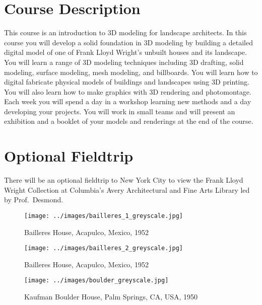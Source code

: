 \documentclass[11pt,article,oneside]{memoir}
\begin{document}
\section{Course Description}
%
This course is an introduction to 3D modeling for landscape architects. 
In this course you will develop a solid foundation in 3D modeling
by building a detailed digital model of one of 
Frank Lloyd Wright's unbuilt houses and its landscape. 
%
You will learn a range of 3D modeling techniques including
3D drafting, solid modeling, surface modeling,  mesh modeling, and billboards. 
%
You will learn how to digital fabricate physical models 
of buildings and landscapes using 3D printing. 
%
You will also learn how to make graphics with
3D rendering and photomontage.
%
Each week you will spend a day in a workshop
learning new methods
and a day developing your projects.
%
You will work in small teams and 
will present an exhibition and a booklet of your
models and renderings at the end of the course.\\

\section{Optional Fieldtrip}
There will be an optional fieldtrip to New York City 
to view the Frank Lloyd Wright Collection 
at Columbia's Avery Architectural and Fine Arts Library 
led by Prof.~Desmond. 

\clearpage


\begin{figure}
\begin{center}
%
\texttt{[image: ../images/bailleres\_1\_greyscale.jpg]}
\caption{Bailleres House, Acapulco, Mexico, 1952}
%
\texttt{[image: ../images/bailleres\_2\_greyscale.jpg]}
\caption{Bailleres House, Acapulco, Mexico, 1952}
%
\texttt{[image: ../images/boulder\_greyscale.jpg]}
\caption{Kaufman Boulder House, Palm Springs, CA, USA, 1950}
%
\label{fig:unbuilt_houses}
\end{center}
\end{figure}

\clearpage

\end{document}
